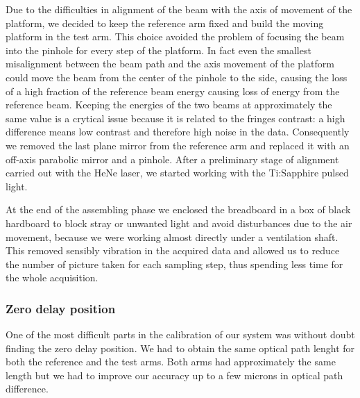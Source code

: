 \documentclass[12pt,a4paper,twoside]{article}
\begin{document}
Due to the difficulties in alignment of the beam with the axis of movement of the platform, we decided to keep the reference arm fixed and build the moving platform in the test arm.
This choice avoided the problem of focusing the beam into the pinhole for every step of the platform.
In fact even the smallest misalignment between the beam path and the axis movement of the platform could move the beam from the center of the pinhole to the side, causing the loss of a high fraction of the reference beam energy
causing loss of energy from the reference beam.
Keeping the energies of the two beams at approximately the same value is a crytical issue because it is related to the fringes contrast: a high difference means low contrast and therefore high noise in the data.
Consequently we removed the last plane mirror from the reference arm and replaced it with an off-axis parabolic mirror and a pinhole.
After a preliminary stage of alignment carried out with the HeNe laser, we started working with the Ti:Sapphire pulsed light.

At the end of the assembling phase we enclosed the breadboard in a box of black hardboard to block stray or unwanted light and avoid  disturbances due to the air movement, because we were working almost directly under a ventilation shaft.
This removed sensibly vibration in the acquired data and allowed us to reduce the number of picture taken for each sampling step, thus spending less time for the whole acquisition.

\subsubsection*{Zero delay position}
One of the most difficult parts in the calibration of our system was without doubt finding the zero delay position.
We had to obtain the same optical path lenght for both the reference and the test arms.
Both arms had approximately the same length but we had to improve our accuracy up to a few microns in optical path difference.
\end{document}
